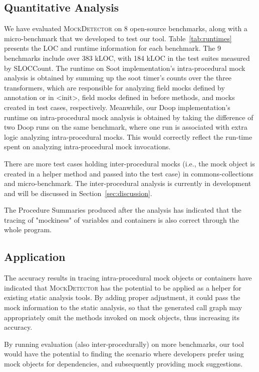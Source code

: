 \subsection{Quantitative Analysis}
\label{subsec:effectiveness}

We have evaluated \textsc{MockDetector} on 8 open-source benchmarks, along with a micro-benchmark that we developed to test our tool. Table~\ref{tab:runtimes} presents the LOC and runtime information for each benchmark. The 9 benchmarks include over 383 kLOC, with 184 kLOC in the test suites measured by SLOCCount. The runtime on Soot implementation's intra-procedural mock analysis  is obtained by summing up the soot timer's counts over the three transformers, which are responsible for analyzing field mocks defined by annotation or in <init>, field mocks defined in before methods, and mocks created in test cases, respectively. Meanwhile, our Doop implementation's runtime on intra-procedural mock analysis is obtained by taking the difference of two Doop runs on the same benchmark, where one run is associated with extra logic analyzing intra-procedural mocks. This would correctly reflect the run-time spent on analyzing intra-procedural mock invocations.  %

There are more test cases holding inter-procedural mocks (i.e., the mock object is created in a helper method and passed into the test case) in commons-collections and micro-benchmark. The inter-procedural analysis is currently in development and will be discussed in Section~\ref{sec:discussion}.

The Procedure Summaries produced after the analysis has indicated that the tracing of "mockiness" of variables and containers is also correct through the whole program. 

\subsection{Application}
\label{subsec:static}

The accuracy results in tracing intra-procedural mock objects or containers have indicated that \textsc{MockDetector} has the potential to be applied as a helper for existing static analysis tools. By adding proper adjustment, it could pass the mock information to the static analysis, so that the generated call graph may appropriately omit the methods invoked on mock objects, thus increasing its accuracy.

By running evaluation (also inter-procedurally) on more benchmarks, our tool would have the potential to finding the scenario where developers prefer using mock objects for dependencies, and subsequently providing mock suggestions.
